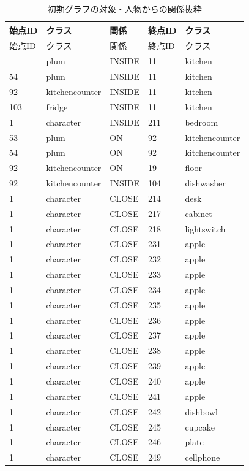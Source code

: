{\scriptsize\setlength{\tabcolsep}{3pt}
\begin{longtable}{lllll}
\caption{初期グラフの対象・人物からの関係抜粋}\label{tab:real_edges_test_task65}\\
\hline
始点ID & クラス & 関係 & 終点ID & クラス\\\hline\endfirsthead
始点ID & クラス & 関係 & 終点ID & クラス\\\hline\endhead
\hline\endfoot
53 & plum & INSIDE & 11 & kitchen \\
54 & plum & INSIDE & 11 & kitchen \\
92 & kitchencounter & INSIDE & 11 & kitchen \\
103 & fridge & INSIDE & 11 & kitchen \\
1 & character & INSIDE & 211 & bedroom \\
53 & plum & ON & 92 & kitchencounter \\
54 & plum & ON & 92 & kitchencounter \\
92 & kitchencounter & ON & 19 & floor \\
92 & kitchencounter & INSIDE & 104 & dishwasher \\
1 & character & CLOSE & 214 & desk \\
1 & character & CLOSE & 217 & cabinet \\
1 & character & CLOSE & 218 & lightswitch \\
1 & character & CLOSE & 231 & apple \\
1 & character & CLOSE & 232 & apple \\
1 & character & CLOSE & 233 & apple \\
1 & character & CLOSE & 234 & apple \\
1 & character & CLOSE & 235 & apple \\
1 & character & CLOSE & 236 & apple \\
1 & character & CLOSE & 237 & apple \\
1 & character & CLOSE & 238 & apple \\
1 & character & CLOSE & 239 & apple \\
1 & character & CLOSE & 240 & apple \\
1 & character & CLOSE & 241 & apple \\
1 & character & CLOSE & 242 & dishbowl \\
1 & character & CLOSE & 245 & cupcake \\
1 & character & CLOSE & 246 & plate \\
1 & character & CLOSE & 249 & cellphone \\

\end{longtable}}
